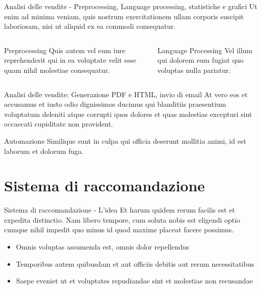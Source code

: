 \documentclass{beamer}
\begin{document}
	\begin{frame}{Analisi delle vendite - Preprocessing, Language processing, statistiche e grafici}
		Ut enim ad minima veniam, quis nostrum exercitationem ullam corporis suscipit laboriosam, nisi ut aliquid ex ea commodi consequatur.

		\begin{columns}
			\begin{column}{0.5\textwidth}
				\begin{block}{Preprocessing}
					Quis autem vel eum iure reprehenderit qui in ea voluptate velit esse quam nihil molestiae consequatur.
				\end{block}
			\end{column}
			\begin{column}{0.5\textwidth}
				\begin{block}{Language Processing}
					Vel illum qui dolorem eum fugiat quo voluptas nulla pariatur.
				\end{block}
			\end{column}
		\end{columns}
	\end{frame}

	\begin{frame}{Analisi delle vendite: Generazione PDF e HTML, invio di email}
		At vero eos et accusamus et iusto odio dignissimos ducimus qui blanditiis praesentium voluptatum deleniti atque corrupti quos dolores et quas molestias excepturi sint occaecati cupiditate non provident.

		\begin{alertblock}{Automazione}
			Similique sunt in culpa qui officia deserunt mollitia animi, id est laborum et dolorum fuga.
		\end{alertblock}
	\end{frame}


	\section{Sistema di raccomandazione}

	\begin{frame}{Sistema di raccomandazione - L'idea}
		Et harum quidem rerum facilis est et expedita distinctio. Nam libero tempore, cum soluta nobis est eligendi optio cumque nihil impedit quo minus id quod maxime placeat facere possimus.

		\begin{itemize}
			\item Omnis voluptas assumenda est, omnis dolor repellendus
			\item Temporibus autem quibusdam et aut officiis debitis aut rerum necessitatibus
			\item Saepe eveniet ut et voluptates repudiandae sint et molestiae non recusandae
		\end{itemize}
	\end{frame}
\end{document}
